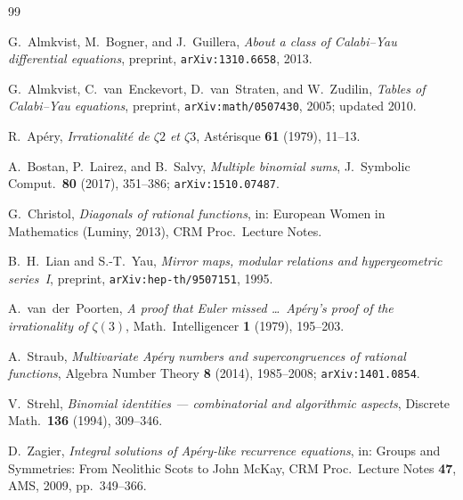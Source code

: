 \documentclass[12pt,reqno]{amsart}
\theoremstyle{plain}
\theoremstyle{definition}
\theoremstyle{remark}
\begin{document}

\begin{thebibliography}{99}

G.~Almkvist, M.~Bogner, and J.~Guillera,
\emph{About a class of Calabi--Yau differential equations},
preprint, \texttt{arXiv:1310.6658}, 2013.

G.~Almkvist, C.~van~Enckevort, D.~van~Straten, and W.~Zudilin,
\emph{Tables of Calabi--Yau equations},
preprint, \texttt{arXiv:math/0507430}, 2005; updated 2010.

R.~Ap\'ery,
\emph{Irrationalit\'e de $\zeta 2$ et $\zeta 3$},
Ast\'erisque \textbf{61} (1979), 11--13.

A.~Bostan, P.~Lairez, and B.~Salvy,
\emph{Multiple binomial sums},
J.~Symbolic Comput.\ \textbf{80} (2017), 351--386;
\texttt{arXiv:1510.07487}.

G.~Christol,
\emph{Diagonals of rational functions},
in: European Women in Mathematics (Luminy, 2013), CRM Proc.\ Lecture Notes.

B.~H.~Lian and S.-T.~Yau,
\emph{Mirror maps, modular relations and hypergeometric series~I},
preprint, \texttt{arXiv:hep-th/9507151}, 1995.

A.~van~der~Poorten,
\emph{A proof that Euler missed \ldots\ Ap\'ery's proof of the
irrationality of $\zeta(3)$},
Math.\ Intelligencer \textbf{1} (1979), 195--203.

A.~Straub,
\emph{Multivariate Ap\'ery numbers and supercongruences of
rational functions},
Algebra Number Theory \textbf{8} (2014), 1985--2008;
\texttt{arXiv:1401.0854}.

V.~Strehl,
\emph{Binomial identities --- combinatorial and algorithmic
aspects},
Discrete Math.\ \textbf{136} (1994), 309--346.

D.~Zagier,
\emph{Integral solutions of Ap\'ery-like recurrence equations},
in: Groups and Symmetries: From Neolithic Scots to John McKay,
CRM Proc.\ Lecture Notes \textbf{47}, AMS, 2009, pp.~349--366.

\end{thebibliography}
\end{document}

